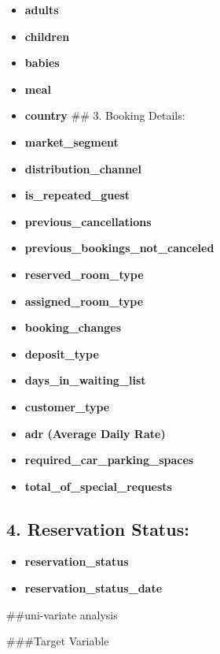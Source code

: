 \documentclass[11pt]{article}
\providecommand{\tightlist}{%
      \setlength{\itemsep}{0pt}\setlength{\parskip}{0pt}}
\begin{document}
\begin{itemize}
\item
  \textbf{adults}
\item
  \textbf{children}
\item
  \textbf{babies}
\item
  \textbf{meal}
\item
  \textbf{country} \#\# 3. Booking Details:
\item
  \textbf{market\_segment}
\item
  \textbf{distribution\_channel}
\item
  \textbf{is\_repeated\_guest}
\item
  \textbf{previous\_cancellations}
\item
  \textbf{previous\_bookings\_not\_canceled}
\item
  \textbf{reserved\_room\_type}
\item
  \textbf{assigned\_room\_type}
\item
  \textbf{booking\_changes}
\item
  \textbf{deposit\_type}
\item
  \textbf{days\_in\_waiting\_list}
\item
  \textbf{customer\_type}
\item
  \textbf{adr (Average Daily Rate)}
\item
  \textbf{required\_car\_parking\_spaces}
\item
  \textbf{total\_of\_special\_requests}
\end{itemize}

\hypertarget{reservation-status}{%
\subsection{4. Reservation Status:}\label{reservation-status}}

\begin{itemize}
\tightlist
\item
  \textbf{reservation\_status}
\item
  \textbf{reservation\_status\_date}
\end{itemize}

    \#\#uni-variate analysis

    \#\#\#Target Variable
\end{document}
